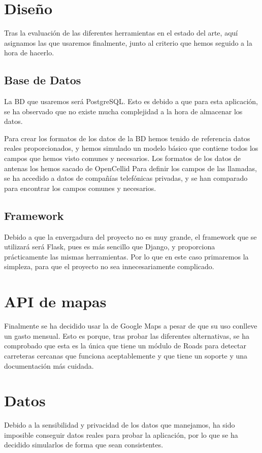\section{Diseño\label{SEC:DISENO}}
  Tras la evaluación de las diferentes herramientas en el estado del arte, aquí asignamos las que usaremos finalmente, junto al criterio que hemos seguido a la hora de hacerlo.
  
  \subsection{Base de Datos}
    La BD que usaremos será PostgreSQL. Esto es debido a que para esta aplicación, se ha observado que no existe mucha complejidad a la hora de almacenar los datos.
    
    Para crear los formatos de los datos de la BD hemos tenido de referencia datos reales proporcionados, y hemos simulado un modelo básico que contiene todos los campos que hemos visto comunes y necesarios.
    Los formatos de los datos de antenas los hemos sacado de OpenCellid \cite{opencellid}
    Para definir los campos de las llamadas, se ha accedido a datos de compañías telefónicas privadas, y se han comparado para encontrar los campos comunes y necesarios.
  \subsection{Framework}
    Debido a que la envergadura del proyecto no es muy grande, el framework que se utilizará será Flask, pues es más sencillo que Django, y proporciona prácticamente las mismas herramientas. Por lo que en este caso primaremos la simpleza, para que el proyecto no sea innecesariamente complicado.

  \section{API de mapas}
    Finalmente se ha decidido usar la  de Google Maps\cite{gmaps} a pesar de que su uso conlleve un gasto mensual. Esto es porque, tras probar las diferentes alternativas, se ha comprobado que esta  es la única que tiene un módulo de Roads para detectar carreteras cercanas que funciona aceptablemente y que tiene un soporte y una documentación más cuidada.
  \section{Datos}
    Debido a la sensibilidad y privacidad de los datos que manejamos, ha sido imposible conseguir datos reales para probar la aplicación, por lo que se ha decidido simularlos de forma que sean consistentes. %
